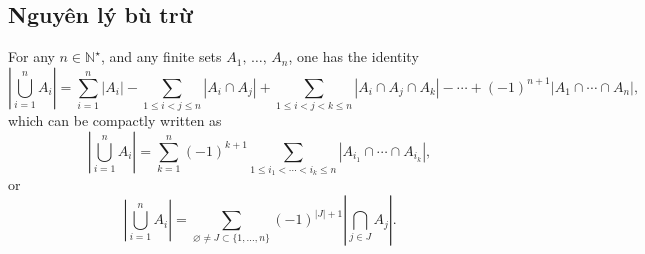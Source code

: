 \subsection{Nguyên lý bù trừ}

\begin{dinhly}
	\label{thm: inclusion-exclusion: combinatorial version}
	For any $n\in\mathbb{N}^\star$, and any finite sets $A_1,\,\ldots,\,A_n$, one has the identity
	\begin{equation*}
		\left|\bigcup_{i=1}^n A_i\right| = \sum_{i=1}^n |A_i| - \sum_{1\le i < j\le n} |A_i\cap A_j| + \sum_{1\le i < j < k\le n} |A_i\cap A_j\cap A_k| - \cdots + (-1)^{n+1}|A_1\cap\cdots\cap A_n|,
	\end{equation*}
	which can be compactly written as
	\begin{equation*}
		\left|\bigcup_{i=1}^n A_i\right| = \sum_{k=1}^n (-1)^{k+1}\sum_{1\le i_1 < \cdots < i_k\le n} |A_{i_1}\cap\cdots\cap A_{i_k}|,
	\end{equation*}
	or
	\begin{equation*}
		\left|\bigcup_{i=1}^n A_i\right| = \sum_{\varnothing\ne J\subset\{1,\ldots,n\}} (-1)^{|J|+1} \left|\bigcap_{j\in J} A_j\right|.
	\end{equation*}
\end{dinhly}


